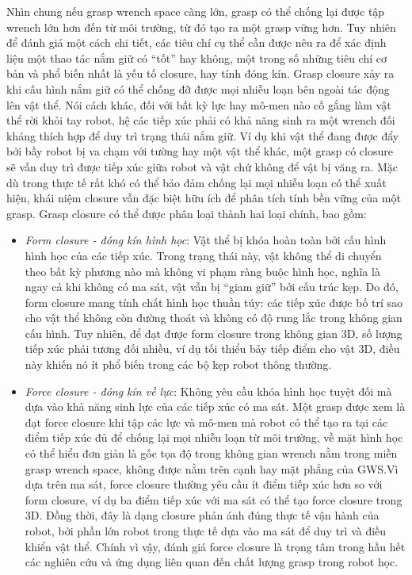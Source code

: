 Nhìn chung nếu grasp wrench space càng lớn, grasp có thể chống lại được tập wrench lớn hơn đến từ môi trường, từ đó tạo ra một grasp vững hơn. Tuy nhiên để đánh giá một cách chi tiết, các tiêu chí cụ thể cần được nêu ra để xác định liệu một thao tác nắm giữ có “tốt” hay không, một trong số những tiêu chí cơ bản và phổ biến nhất là yếu tố closure, hay tính đóng kín. Grasp closure xảy ra khi cấu hình nắm giữ có thể chống đỡ được mọi nhiễu loạn bên ngoài tác động lên vật thể. Nói cách khác, đối với bất kỳ lực hay mô-men nào cố gắng làm vật thể rời khỏi tay robot, hệ các tiếp xúc phải có khả năng sinh ra một wrench đối kháng thích hợp để duy trì trạng thái nắm giữ. Ví dụ khi vật thể đang được đẩy bởi bầy robot bị va chạm với tường hay một vật thể khác, một grasp có closure sẽ vẫn duy trì được tiếp xúc giữa robot và vật chứ không để vật bị văng ra. Mặc dù trong thực tế rất khó có thể bảo đảm chống lại mọi nhiễu loạn có thể xuất hiện, khái niệm closure vẫn đặc biệt hữu ích để phân tích tính bền vững của một grasp. Grasp closure có thể được phân loại thành hai loại chính, bao gồm:
\begin{itemize}
    \item \textit{Form closure - đóng kín hình học}: Vật thể bị khóa hoàn toàn bởi cấu hình hình học của các tiếp xúc. Trong trạng thái này, vật không thể di chuyển theo bất kỳ phương nào mà không vi phạm ràng buộc hình học, nghĩa là ngay cả khi không có ma sát, vật vẫn bị “giam giữ” bởi cấu trúc kẹp. Do đó, form closure mang tính chất hình học thuần túy: các tiếp xúc được bố trí sao cho vật thể không còn đường thoát và không có độ rung lắc trong không gian cấu hình. Tuy nhiên, để đạt được form closure trong không gian 3D, số lượng tiếp xúc phải tương đối nhiều, ví dụ tối thiểu bảy tiếp điểm cho vật 3D, điều này khiến nó ít phổ biến trong các bộ kẹp robot thông thường.
    \item \textit{Force closure - đóng kín về lực}: Không yêu cầu khóa hình học tuyệt đối mà dựa vào khả năng sinh lực của các tiếp xúc có ma sát. Một grasp được xem là đạt force closure khi tập các lực và mô-men mà robot có thể tạo ra tại các điểm tiếp xúc đủ để chống lại mọi nhiễu loạn từ môi trường, về mặt hình học có thể hiểu đơn giản là gốc tọa độ trong không gian wrench nằm trong miền grasp wrench space, không được nằm trên cạnh hay mặt phẳng của GWS.Vì dựa trên ma sát, force closure thường yêu cầu ít điểm tiếp xúc hơn so với form closure, ví dụ ba điểm tiếp xúc với ma sát có thể tạo force closure trong 3D. Đồng thời, đây là dạng closure phản ánh đúng thực tế vận hành của robot, bởi phần lớn robot trong thực tế dựa vào ma sát để duy trì và điều khiển vật thể. Chính vì vậy, đánh giá force closure là trọng tâm trong hầu hết các nghiên cứu và ứng dụng liên quan đến chất lượng grasp trong robot học.
\end{itemize}

